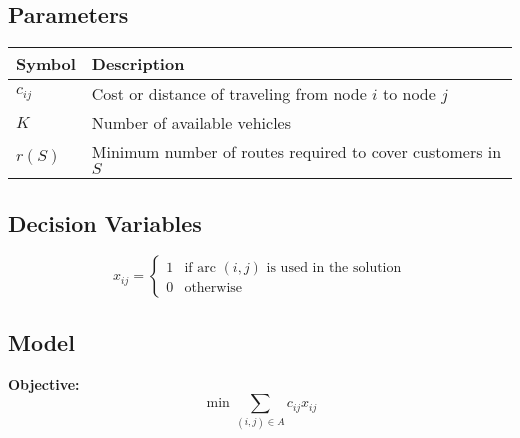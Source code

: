 \bigskip

\subsection*{Parameters}

\begin{table}[ht]
    \begin{tabular}{ll}
        \toprule
        Symbol   & Description                                                 \\
        \midrule
        $c_{ij}$ & Cost or distance of traveling from node $i$ to node $j$     \\
        $K$      & Number of available vehicles                                \\
        $r(S)$   & Minimum number of routes required to cover customers in $S$ \\
        \bottomrule
    \end{tabular}
\end{table}

\bigskip

\subsection*{Decision Variables}
\begin{equation}
    x_{ij} =
    \begin{cases}
        1 & \text{if arc } (i,j) \text{ is used in the solution} \\
        0 & \text{otherwise}
    \end{cases}
\end{equation}

\bigskip

\subsection*{Model}
\textbf{Objective:}
\begin{equation}
    \label{eq:objective}
    \min \sum_{(i,j)\in A} c_{ij}x_{ij}
\end{equation}

